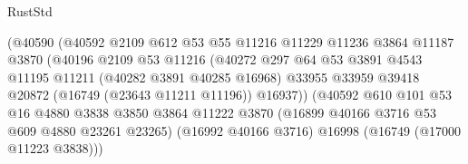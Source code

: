 \begin{lexlean}{RustStd}
\begin{coremodule}
                                          (@40590
                                            (@40592
                                              @2109
                                              @612
                                              @53
                                              @55
                                              @11216
                                              @11229
                                              @11236
                                              @3864
                                              @11187
                                              @3870
                                              (@40196
                                                @2109
                                                @53
                                                @11216
                                                (@40272
                                                  @297
                                                  @64
                                                  @53
                                                  @3891
                                                  @4543
                                                  @11195
                                                  @11211
                                                  (@40282 @3891 @40285 @16968)
                                                  @33955
                                                  @33959
                                                  @39418
                                                  @20872
                                                  (@16749 (@23643 @11211 @11196))
                                                  @16937))
                                              (@40592
                                                @610
                                                @101
                                                @53
                                                @16
                                                @4880
                                                @3838
                                                @3850
                                                @3864
                                                @11222
                                                @3870
                                                (@16899 @40166 @3716 @53 @609 @4880 @23261 @23265)
                                                (@16992 @40166 @3716)
                                                @16998
                                                (@16749 (@17000 @11223 @3838)))

\end{coremodule}
\end{lexlean}
